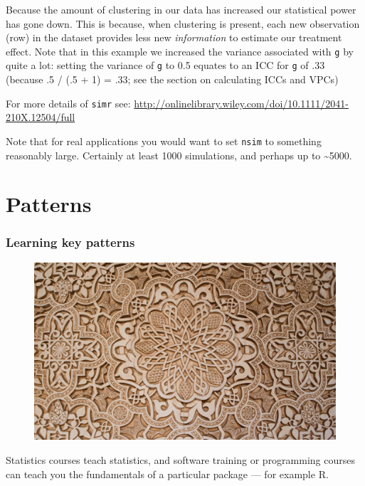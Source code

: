 \documentclass[]{article}
\theoremstyle{definition}
\theoremstyle{definition}
\theoremstyle{definition}
\theoremstyle{remark}
\begin{document}
Because the amount of clustering in our data has increased our
statistical power has gone down. This is because, when clustering is
present, each new observation (row) in the dataset provides less new
\emph{information} to estimate our treatment effect. Note that in this
example we increased the variance associated with \texttt{g} by quite a
lot: setting the variance of \texttt{g} to 0.5 equates to an ICC for
\texttt{g} of .33 (because .5 / (.5 + 1) = .33; see the section on
\protect\hypertarget{icc-and-vpc}{}{calculating ICCs and VPCs})

For more details of \texttt{simr} see:
\url{http://onlinelibrary.wiley.com/doi/10.1111/2041-210X.12504/full}

{Note that for real applications you would want to set \texttt{nsim} to
something reasonably large. Certainly at least 1000 simulations, and
perhaps up to \textasciitilde{}5000.}

\part{Patterns}\label{part-patterns}

\section{Learning key patterns}\label{learning-key-patterns}

\begin{figure}
\centering
\includegraphics{media/patterns.png}
\caption{}
\end{figure}

Statistics courses teach statistics, and software training or
programming courses can teach you the fundamentals of a particular
package --- for example R.
\end{document}
